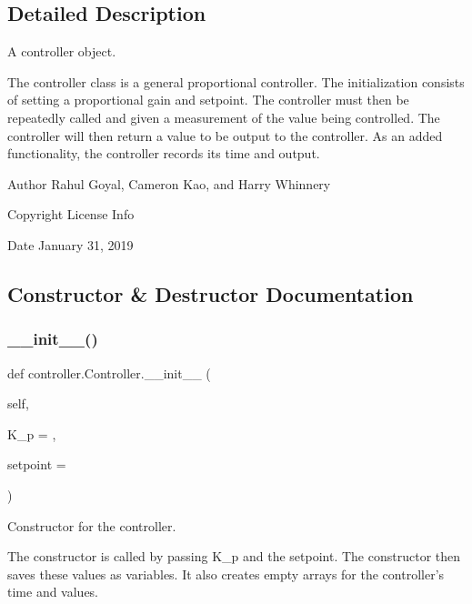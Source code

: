 \subsection{Detailed Description}
A controller object. 

The controller class is a general proportional controller. The initialization consists of setting a proportional gain and setpoint. The controller must then be repeatedly called and given a measurement of the value being controlled. The controller will then return a value to be output to the controller. As an added functionality, the controller records its time and output. \begin{DoxyAuthor}{Author}
Rahul Goyal, Cameron Kao, and Harry Whinnery 
\end{DoxyAuthor}
\begin{DoxyCopyright}{Copyright}
License Info 
\end{DoxyCopyright}
\begin{DoxyDate}{Date}
January 31, 2019 
\end{DoxyDate}


\subsection{Constructor \& Destructor Documentation}
\mbox{\label{classcontroller_1_1_controller_a6a7ea9c3701a0d3fc752bd898c8fb2a3}} 
\subsubsection{\texorpdfstring{\_\_init\_\_()}{\_\_init\_\_()}}
{\footnotesize\ttfamily def controller.\+Controller.\+\_\+\+\_\+init\+\_\+\+\_\+ (\begin{DoxyParamCaption}\item[{}]{self,  }\item[{}]{K\+\_\+p = {},  }\item[{}]{setpoint = {} }\end{DoxyParamCaption})}



Constructor for the controller. 

The constructor is called by passing K\+\_\+p and the setpoint. The constructor then saves these values as variables. It also creates empty arrays for the controller’s time and values.


